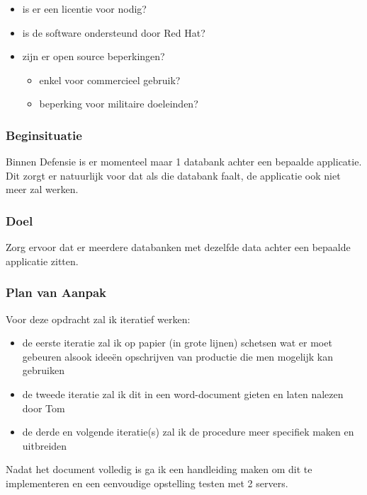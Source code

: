 \begin{itemize}
    \item is er een licentie voor nodig?
    \item is de software ondersteund door Red Hat?
    \item zijn er open source beperkingen?
    \begin{itemize}
        \item enkel voor commercieel gebruik?
        \item beperking voor militaire doeleinden?
    \end{itemize}
\end{itemize}

\subsubsection{Beginsituatie}

Binnen Defensie is er momenteel maar 1 databank achter een bepaalde applicatie. Dit zorgt er natuurlijk voor dat als die databank faalt, de applicatie ook niet meer zal werken.

\subsubsection{Doel}

Zorg ervoor dat er meerdere databanken met dezelfde data achter een bepaalde applicatie zitten.

\subsubsection{Plan van Aanpak}

Voor deze opdracht zal ik iteratief werken:

\begin{itemize}
    \item de eerste iteratie zal ik op papier (in grote lijnen) schetsen wat er moet gebeuren alsook ideeën opschrijven van productie die men mogelijk kan gebruiken
    \item de tweede iteratie zal ik dit in een word-document gieten en laten nalezen door Tom
    \item de derde en volgende iteratie(s) zal ik de procedure meer specifiek maken en uitbreiden
\end{itemize}

Nadat het document volledig is ga ik een handleiding maken om dit te implementeren en een eenvoudige opstelling testen met 2 servers.

